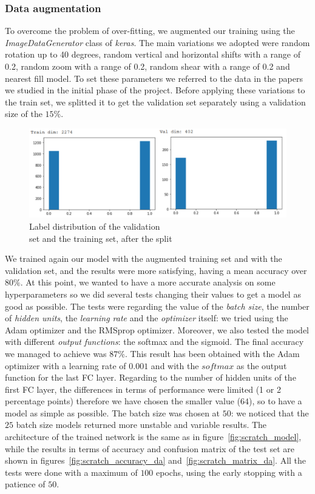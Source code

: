 \documentclass[11pt,a4paper,oneside]{article}
\begin{document}
\clearpage
\subsubsection{Data augmentation}
To overcome the problem of over-fitting, we augmented our training using the \textit{ImageDataGenerator} class of \textit{keras}. The main variations we adopted were random rotation up to 40 degrees, random vertical and horizontal shifts with a range of 0.2, random zoom with a range of 0.2, random shear with a range of 0.2 and nearest fill model. To set these parameters we referred to the data in the papers we studied in the initial phase of the project. Before applying these variations to the train set, we splitted it to get the validation set separately using a validation size of the $15\%$.

\begin{figure}[h]
\centering
\includegraphics[width=.7\textwidth]{images/val_label_distribution}
\caption{Label distribution of the validation \\set and the training set, after the split}
\label{fig:val_label}
\end{figure}

We trained again our model with the augmented training set and with the validation set, and the results were more satisfying, having a mean accuracy over $80\%$. At this point, we wanted to have a more accurate analysis on some hyperparameters so we did several tests changing their values to get a model as good as possible. 
The tests were regarding the value of the \textit{batch size}, the number of \textit{hidden units}, the \textit{learning rate} and the \textit{optimizer} itself: we tried using the Adam optimizer and the RMSprop optimizer. Moreover, we also tested the model with different \textit{output functions}: the softmax and the sigmoid. 
The final accuracy we managed to achieve was $87\%$. This result has been obtained with the   Adam optimizer with a learning rate of $0.001$ and with the $softmax$ as the output function for the last FC layer. Regarding to the number of hidden units of the first FC layer, the differences in terms of performance were limited (1 or 2 percentage points) therefore we have chosen the smaller value ($64$), so to have a model as simple as possible. The batch size was chosen at $50$: we noticed that the $25$ batch size models returned more unstable and variable results. The architecture of the trained network is the same as in figure~\ref{fig:scratch_model}, while the results in terms of accuracy and confusion matrix of the test set are shown in figures~\ref{fig:scratch_accuracy_da} and~\ref{fig:scratch_matrix_da}.
All the tests were done with a maximum of $100$ epochs, using the early stopping with a patience of $50$.
\end{document}
